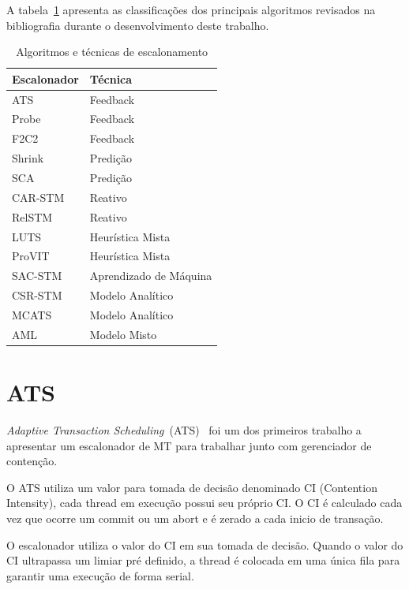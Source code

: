 \documentclass[diss,capa]{texufpel}
\begin{document}

A tabela~\ref{tab:compare} apresenta as classificações dos principais algoritmos revisados na bibliografia durante o desenvolvimento deste trabalho.

\begin{table}[]
\footnotesize
\centering
\caption{Algoritmos e técnicas de escalonamento}
\label{tab:compare}
\begin{tabular}{l|l}
\hline
Escalonador & Técnica \\ \hline
ATS & Feedback \\
Probe & Feedback \\
F2C2 & Feedback \\
Shrink & Predição \\
SCA & Predição \\
CAR-STM & Reativo \\
RelSTM & Reativo \\
LUTS & Heurística Mista \\
ProVIT & Heurística Mista \\
SAC-STM & Aprendizado de Máquina \\
CSR-STM & Modelo Analítico \\
MCATS & Modelo Analítico \\
AML & Modelo Misto \\
\hline
\end{tabular}
\end{table}

\section{ATS}

\emph{Adaptive Transaction Scheduling}~(ATS)~\cite{ats2008} foi um dos primeiros trabalho a apresentar um escalonador de MT para trabalhar junto com gerenciador de contenção.

O ATS utiliza um valor para tomada de decisão denominado CI (Contention Intensity), cada thread em execução possui seu próprio CI. O CI é calculado cada vez que ocorre um commit ou um abort e é zerado a cada inicio de transação.

O escalonador utiliza o valor do CI em sua tomada de decisão. Quando o valor do CI ultrapassa um limiar pré definido, a thread é colocada em uma única fila para garantir uma execução de forma serial.
\end{document}
